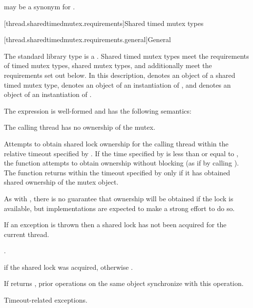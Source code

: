 \pnum
{} may be a synonym for .

[thread.sharedtimedmutex.requirements]{Shared timed mutex types}

[thread.sharedtimedmutex.requirements.general]{General}

\pnum
The standard library type  is a
. Shared timed mutex types meet the requirements of
timed mutex types,
shared mutex types, and additionally
meet the requirements set out below. In this description,
 denotes an object of a shared timed mutex type,
 denotes an object of an instantiation of
, and
 denotes an object of an instantiation of
.

\pnum
The expression  is well-formed and
has the following semantics:

\begin{itemdescr}
\pnum
\expects
The calling thread has no ownership of the mutex.

\pnum
\effects
Attempts to obtain
shared lock ownership for the calling thread within the relative
timeout specified by . If the time
specified by  is less than or equal to ,
the function attempts to obtain ownership without blocking (as if by calling
). The function returns within the timeout
specified by  only if it has obtained shared ownership of the
mutex object.
\begin{note}
As with , there is no guarantee that
ownership will be obtained if the lock is available, but implementations are
expected to make a strong effort to do so.
\end{note}
If an exception is thrown then a shared lock has not been acquired for
the current thread.

\pnum
\returntype {}.

\pnum
\returns
{} if the shared lock was acquired, otherwise .

\pnum
\sync
If  returns , prior
 operations on the same object synchronize
with this operation.

\pnum
\throws
Timeout-related exceptions.
\end{itemdescr}

